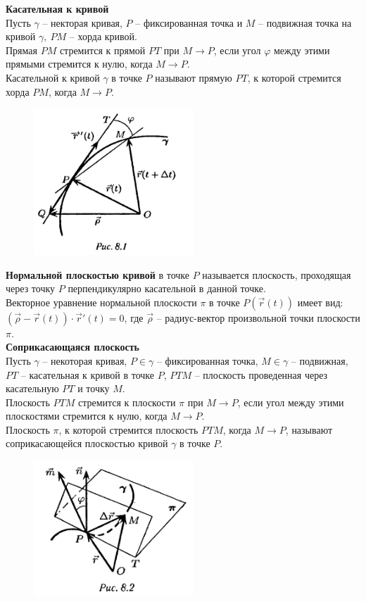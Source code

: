 \documentclass{report}
\begin{document}
\noindent
\textbf{Касательная к кривой}\\
Пусть $\gamma$ -- некторая кривая, $P$ -- фиксированная точка и $M$ -- подвижная точка на кривой
$\gamma,\ PM$ -- хорда кривой.\\
Прямая $PM$ стремится к прямой $PT$ при $M \to P$, если угол $\varphi$ между этими прямыми стремится
к нулю, когда $M \to P$.\\
Касательной к кривой $\gamma$ в точке $P$ называют прямую $PT$, к которой стремится хорда $PM$,
когда $M \to P$.\\
\begin{figure}[ht!]
\centering
\includegraphics[width=60mm]{curve.png}
\end{figure}

\noindent
\textbf{Нормальной плоскостью кривой} в точке $P$ называется плоскость, проходящая через точку
$P$ перпендикулярно касательной в данной точке.\\
Векторное уравнение нормальной плоскости $\pi$ в точке $P(\overrightarrow{r}(t))$ имеет вид:
$(\overrightarrow{\rho} - \overrightarrow{r}(t)) \cdot \overrightarrow{r}'(t) = 0$, где 
$\overrightarrow{\rho}$ -- радиус-вектор произвольной точки плоскости $\pi$.\\

\newpage
\noindent
\textbf{Соприкасающаяся плоскость}\\
Пусть $\gamma$ -- некоторая кривая, $P \in \gamma$ -- фиксированная точка, $M \in \gamma$ --
подвижная, $PT$ -- касательная к кривой в точке $P$, $PTM$ -- плоскость проведенная через
касательную $PT$ и точку $M$.\\
Плоскость $PTM$ стремится к плоскости $\pi$ при $M \to P$, если угол между этими плоскостями
стремится к нулю, когда $M \to P$.\\
Плоскость $\pi$, к которой стремится плоскость $PTM$, когда $M \to P$, называют
соприкасающейся плоскостью кривой $\gamma$ в точке $P$.\\
\begin{figure}[ht!]
\centering
\includegraphics[width=60mm]{curve2.png}
\end{figure}
\end{document}
